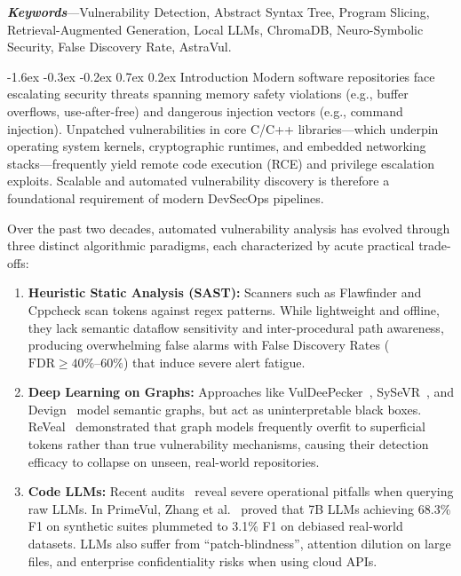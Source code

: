 \documentclass[10pt,twocolumn]{article}
\makeatletter
\renewcommand\section{\@startsection{section}{1}{\z@}%
  {-1.6ex \@plus -0.3ex \@minus -0.2ex}%
  {0.7ex \@plus 0.2ex}%
  {\normalfont\large\bfseries}}
\makeatother
\begin{document}
\vspace{1pt}
\noindent\textbf{\textit{Keywords}}---Vulnerability Detection, Abstract Syntax Tree, Program Slicing, Retrieval-Augmented Generation, Local LLMs, ChromaDB, Neuro-Symbolic Security, False Discovery Rate, AstraVul.

\section{Introduction}
Modern software repositories face escalating security threats spanning memory safety violations (e.g., buffer overflows, use-after-free) and dangerous injection vectors (e.g., command injection). Unpatched vulnerabilities in core C/C++ libraries—which underpin operating system kernels, cryptographic runtimes, and embedded networking stacks—frequently yield remote code execution (RCE) and privilege escalation exploits. Scalable and automated vulnerability discovery is therefore a foundational requirement of modern DevSecOps pipelines.

Over the past two decades, automated vulnerability analysis has evolved through three distinct algorithmic paradigms, each characterized by acute practical trade-offs:
\begin{enumerate}[leftmargin=9pt,topsep=1pt,itemsep=0.5pt]
    \item \textbf{Heuristic Static Analysis (SAST):} Scanners such as Flawfinder and Cppcheck scan tokens against regex patterns. While lightweight and offline, they lack semantic dataflow sensitivity and inter-procedural path awareness, producing overwhelming false alarms with False Discovery Rates ($\text{FDR} \ge 40\%$--$60\%$) that induce severe alert fatigue.
    \item \textbf{Deep Learning on Graphs:} Approaches like VulDeePecker~\cite{li2018vuldeepecker}, SySeVR~\cite{li2021sysevr}, and Devign~\cite{zhou2019devign} model semantic graphs, but act as uninterpretable black boxes. ReVeal~\cite{chakraborty2021reveal} demonstrated that graph models frequently overfit to superficial tokens rather than true vulnerability mechanisms, causing their detection efficacy to collapse on unseen, real-world repositories.
    \item \textbf{Code LLMs:} Recent audits~\cite{zhang2025howfar,arp2026chasingshadows} reveal severe operational pitfalls when querying raw LLMs. In PrimeVul, Zhang et al.~\cite{zhang2025howfar} proved that 7B LLMs achieving 68.3\% F1 on synthetic suites plummeted to 3.1\% F1 on debiased real-world datasets. LLMs also suffer from ``patch-blindness'', attention dilution on large files, and enterprise confidentiality risks when using cloud APIs.
\end{enumerate}
\end{document}
